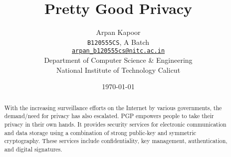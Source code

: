 \documentclass[12pt,a4paper]{article}
\begin{document}
\title{\Huge{Pretty Good Privacy}}
\author{Arpan Kapoor\\
	\texttt{B120555CS}, A Batch\\
	\href{mailto:arpan_b120555cs@nitc.ac.in}
	{\nolinkurl{arpan_b120555cs@nitc.ac.in}}\\[0.30cm]
	Department of Computer Science \& Engineering\\
	National Institute of Technology Calicut
}
\date{\today}

\maketitle

\begin{abstract}
With the increasing surveillance efforts on the Internet by various governments,
the demand\slash need for privacy has also escalated. PGP empowers people to
take their privacy in their own hands. It provides security services for
electronic communication and data storage using a combination of strong
public-key and symmetric cryptography. These services include confidentiality,
key management, authentication, and digital signatures.
\end{abstract}

\nocite{*}
\printbibliography
\end{document}
